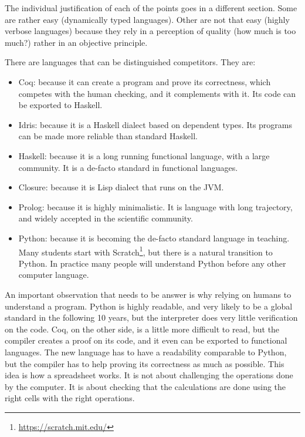 {    The individual justification of each of the points goes in a different section.
    Some are rather easy (dynamically typed languages). Other are not that easy (highly verbose languages) because they rely in a perception of quality (how much is too much?) rather in an objective principle.

    There are languages that can be distinguished competitors.
    They are:
    \begin{itemize}
        \item Coq: because it can create a program and prove its correctness, which competes with the human checking, and it complements with it. Its code can be exported to Haskell.
        \item Idris: because it is a Haskell dialect based on dependent types. Its programs can be made more reliable than standard Haskell.
        \item Haskell: because it is a long running functional language, with a large community. It is a de-facto standard in functional languages.
        \item Closure: because it is Lisp dialect that runs on the JVM.
        \item Prolog: because it is highly minimalistic. It is language with long trajectory, and widely accepted in the scientific community.
        \item Python: because it is becoming the de-facto standard language in teaching. Many students start with Scratch\footnote{\url{https://scratch.mit.edu/}}, but there is a natural transition to Python. In practice many people will understand Python before any other computer language.
    \end{itemize}

    An important observation that needs to be answer is why relying on humans to understand a program.
    Python is highly readable, and very likely to be a global standard in the following 10 years, but the interpreter does very little verification on the code.
    Coq, on the other side, is a little more difficult to read, but the compiler creates a proof on its code, and it even can be exported to functional languages.
    The new language has to have a readability comparable to Python, but the compiler has to help proving its correctness as much as possible.
    This idea is how a spreadsheet works.
    It is not about challenging the operations done by the computer.
    It is about checking that the calculations are done using the right cells with the right operations.
}

